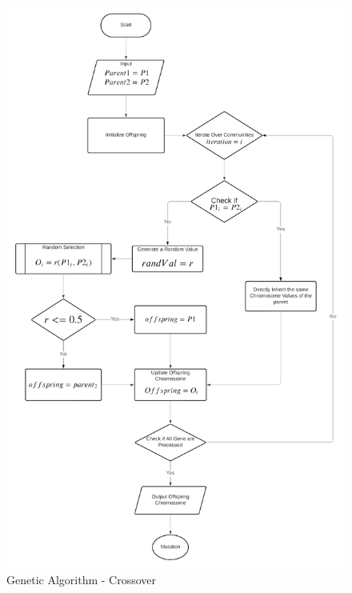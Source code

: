\begin{appendices}
\begin{centerappendixtitle}
		\begin{figure}[h]
			\centering
			\caption{Genetic Algorithm - Crossover}
			\label{crossFlow}
			\includegraphics[width=\textwidth,height=\textheight,keepaspectratio]{appendix/crossover f}
		\end{figure}
		

\end{centerappendixtitle}
\end{appendices}
